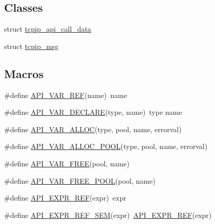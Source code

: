 \subsection*{Classes}
\begin{DoxyCompactItemize}
\item 
struct \hyperlink{structtcpip__api__call__data}{tcpip\+\_\+api\+\_\+call\+\_\+data}
\item 
struct \hyperlink{structtcpip__msg}{tcpip\+\_\+msg}
\end{DoxyCompactItemize}
\subsection*{Macros}
\begin{DoxyCompactItemize}
\item 
\#define \hyperlink{openmote-cc2538_2lwip_2src_2include_2lwip_2priv_2tcpip__priv_8h_a3518256af0d1a422755a899b13c2b563}{A\+P\+I\+\_\+\+V\+A\+R\+\_\+\+R\+EF}(name)~name
\item 
\#define \hyperlink{openmote-cc2538_2lwip_2src_2include_2lwip_2priv_2tcpip__priv_8h_ab5d4a4fa91c4c144bedabf593a68b4dd}{A\+P\+I\+\_\+\+V\+A\+R\+\_\+\+D\+E\+C\+L\+A\+RE}(type,  name)~type name
\item 
\#define \hyperlink{openmote-cc2538_2lwip_2src_2include_2lwip_2priv_2tcpip__priv_8h_a8ff9b936b16d91844c0e32424e97f493}{A\+P\+I\+\_\+\+V\+A\+R\+\_\+\+A\+L\+L\+OC}(type,  pool,  name,  errorval)
\item 
\#define \hyperlink{openmote-cc2538_2lwip_2src_2include_2lwip_2priv_2tcpip__priv_8h_a0b826b1ea2ee54ebb94ab354578a1ffe}{A\+P\+I\+\_\+\+V\+A\+R\+\_\+\+A\+L\+L\+O\+C\+\_\+\+P\+O\+OL}(type,  pool,  name,  errorval)
\item 
\#define \hyperlink{openmote-cc2538_2lwip_2src_2include_2lwip_2priv_2tcpip__priv_8h_a30caebb5334f52d49ac938a507094094}{A\+P\+I\+\_\+\+V\+A\+R\+\_\+\+F\+R\+EE}(pool,  name)
\item 
\#define \hyperlink{openmote-cc2538_2lwip_2src_2include_2lwip_2priv_2tcpip__priv_8h_a803c2dd81f7e69515115b78759be0d76}{A\+P\+I\+\_\+\+V\+A\+R\+\_\+\+F\+R\+E\+E\+\_\+\+P\+O\+OL}(pool,  name)
\item 
\#define \hyperlink{openmote-cc2538_2lwip_2src_2include_2lwip_2priv_2tcpip__priv_8h_a1f3c3ae0938b5510978cbd31560a5797}{A\+P\+I\+\_\+\+E\+X\+P\+R\+\_\+\+R\+EF}(expr)~expr
\item 
\#define \hyperlink{openmote-cc2538_2lwip_2src_2include_2lwip_2priv_2tcpip__priv_8h_a91e803b3c3f0ab89b20d7a85e3e92624}{A\+P\+I\+\_\+\+E\+X\+P\+R\+\_\+\+R\+E\+F\+\_\+\+S\+EM}(expr)~\hyperlink{openmote-cc2538_2lwip_2src_2include_2lwip_2priv_2tcpip__priv_8h_a1f3c3ae0938b5510978cbd31560a5797}{A\+P\+I\+\_\+\+E\+X\+P\+R\+\_\+\+R\+EF}(expr)

\end{DoxyCompactItemize}
